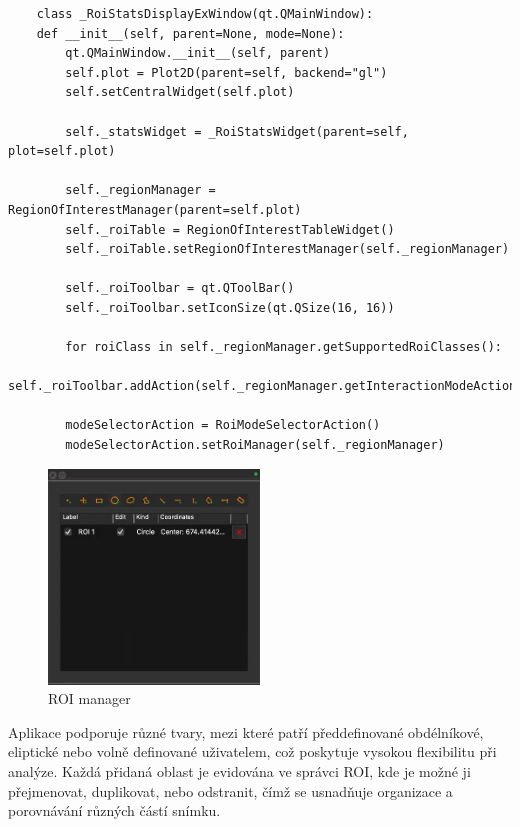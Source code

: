 \documentclass{article}
\begin{document}
\begin{lstlisting}
    class _RoiStatsDisplayExWindow(qt.QMainWindow):
    def __init__(self, parent=None, mode=None):
        qt.QMainWindow.__init__(self, parent)
        self.plot = Plot2D(parent=self, backend="gl")
        self.setCentralWidget(self.plot)

        self._statsWidget = _RoiStatsWidget(parent=self, plot=self.plot)

        self._regionManager = RegionOfInterestManager(parent=self.plot)
        self._roiTable = RegionOfInterestTableWidget()
        self._roiTable.setRegionOfInterestManager(self._regionManager)

        self._roiToolbar = qt.QToolBar()
        self._roiToolbar.setIconSize(qt.QSize(16, 16))

        for roiClass in self._regionManager.getSupportedRoiClasses():
            self._roiToolbar.addAction(self._regionManager.getInteractionModeAction(roiClass))

        modeSelectorAction = RoiModeSelectorAction()
        modeSelectorAction.setRoiManager(self._regionManager)

\end{lstlisting}
\newpage
\begin{figure}[htp]
    \centering
    \includegraphics[width=0.5\textwidth]{images/ROIManager.png}
    \caption{ROI manager}
\end{figure}

Aplikace podporuje různé tvary, mezi které patří předdefinované obdélníkové, eliptické nebo volně definované uživatelem, což poskytuje vysokou flexibilitu při analýze. Každá přidaná oblast je evidována ve správci ROI, kde je možné ji přejmenovat, duplikovat, nebo odstranit, čímž se usnadňuje organizace a porovnávání různých částí snímku.\\
\end{document}
